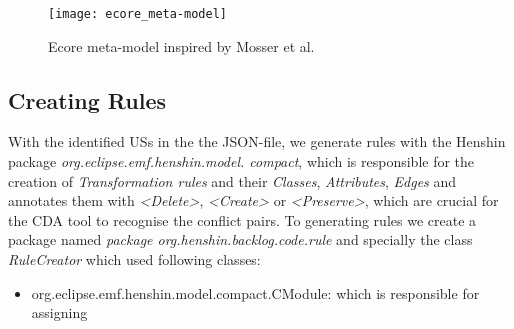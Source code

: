 \begin{figure}[h]
	\center
	\texttt{[image: ecore\_meta-model]}
	\caption{Ecore meta-model inspired by Mosser et al. \cite{mosser2022modelling}}\label{fig:ecore_meta_model}
\end{figure} 
\subsection*{Creating Rules}\label{workflow_rule_creator}
With the identified USs in the the JSON-file, we generate rules with the Henshin package \textit{org.eclipse.emf.henshin.model. compact}, which is responsible for the creation of \textit{Transformation rules} and their \textit{Classes}, \textit{Attributes}, \textit{Edges} and annotates them with \textit{<Delete>}, \textit{<Create>} or \textit{<Preserve>}, which are crucial for the CDA tool to recognise the conflict pairs. 
To generating rules we create a package named \textit{package org.henshin.backlog.code.rule} and specially the class \textit{RuleCreator} which used following classes:
\begin{itemize}
	\item org.eclipse.emf.henshin.model.compact.CModule: which is responsible for assigning 
\end{itemize}



 
%
